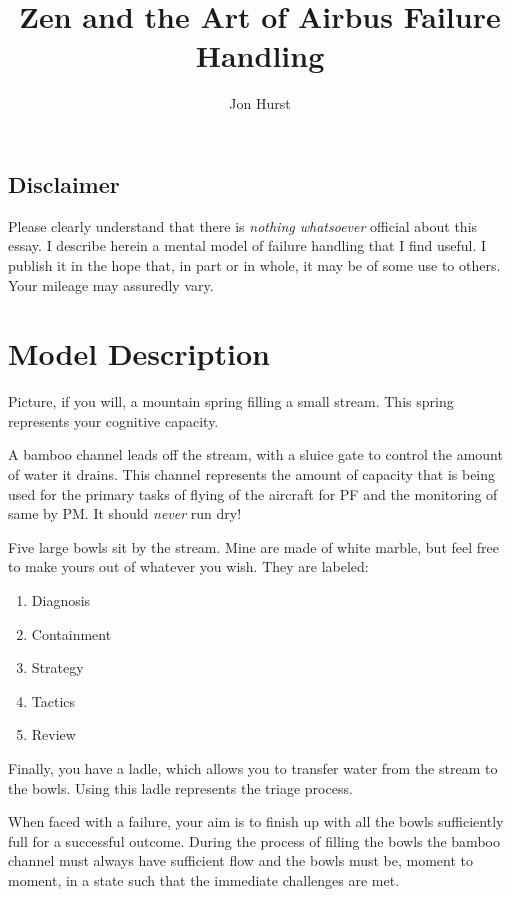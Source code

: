 \documentclass[a5paper,11pt,titlepage]{article}
\title{Zen and the Art of Airbus Failure Handling}
\author{Jon Hurst}
\begin{document}
\maketitle

\begin{tcolorbox}[colframe=red]
\section*{Disclaimer}

Please clearly understand that there is \emph{nothing whatsoever}
official about this essay. I describe herein a mental model of failure
handling that I find useful. I publish it in the hope that, in part or
in whole, it may be of some use to others. Your mileage may assuredly
vary.

\end{tcolorbox}

\section{Model Description}

Picture, if you will, a mountain spring filling a small stream. This
spring represents your cognitive capacity.

A bamboo channel leads off the stream, with a sluice gate to control the
amount of water it drains. This channel represents the amount of
capacity that is being used for the primary tasks of flying of the
aircraft for PF and the monitoring of same by PM. It should \emph{never}
run dry!

Five large bowls sit by the stream. Mine are made of white marble, but
feel free to make yours out of whatever you wish. They are labeled:

\begin{enumerate}
\item Diagnosis
\item Containment
\item Strategy
\item Tactics
\item Review
\end{enumerate}

Finally, you have a ladle, which allows you to transfer water from the
stream to the bowls. Using this ladle represents the triage process.

When faced with a failure, your aim is to finish up with all the bowls
sufficiently full for a successful outcome. During the process of
filling the bowls the bamboo channel must always have sufficient
flow and the bowls must be, moment to moment, in a state such that the
immediate challenges are met.
\end{document}
